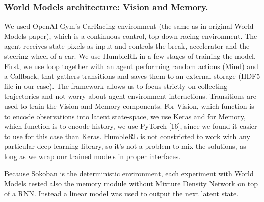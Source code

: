 \subsubsection{World Models architecture: Vision and Memory.}
We used OpenAI Gym’s CarRacing environment (the same as in original World Models paper), which is a continuous-control, top-down racing environment. The agent receives state pixels as input and controls the break, accelerator and the steering wheel of a car.
We use HumbleRL in a few stages of training the model. First, we use loop together with an agent performing random actions (Mind) and a Callback, that gathers transitions and saves them to an external storage (HDF5 file in our case). The framework allows us to focus strictly on collecting trajectories and not worry about agent-environment interactions.
Transitions are used to train the Vision and Memory components. For Vision, which function is to encode observations into latent state-space, we use Keras and for Memory, which function is to encode history, we use PyTorch [16], since we found it easier to use for this case than Keras. HumbleRL is not constricted to work with any particular deep learning library, so it’s not a problem to mix the solutions, as long as we wrap our trained models in proper interfaces.


Because Sokoban is the deterministic environment, each experiment with World Models tested also the memory module without Mixture Density Network on top of a RNN. Instead a linear model was used to output the next latent state.

